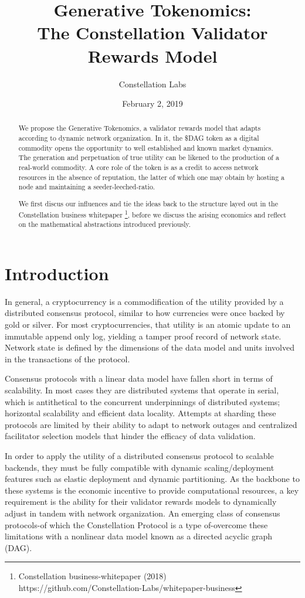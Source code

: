\documentclass{article}
\title{Generative Tokenomics:\\ The Constellation Validator Rewards Model}
\author{Constellation Labs}
\date{February 2, 2019}
\begin{document}
\maketitle

\begin{abstract}
We propose the Generative Tokenomics, a validator rewards model that adapts according to dynamic network organization. In it, the \$DAG token as a digital commodity opens the opportunity to well established and known market dynamics. The generation and perpetuation of true utility can be likened to the production of a real-world commodity. A core role of the token is as a credit to access network resources in the absence of reputation, the latter of which one may obtain by hosting a node and maintaining a seeder-leeched-ratio.

We first discus our influences and tie the ideas back to the structure layed out in the Constellation business whitepaper
\footnote{Constellation business-whitepaper (2018)\\ https://github.com/Constellation-Labs/whitepaper-business}, 
before we discuss the arising economics and reflect on the mathematical abstractions introduced previously. 
\end{abstract}

\setcounter{secnumdepth}{0}
\section{Introduction}
In general, a cryptocurrency is a commodification of the utility provided by a distributed consensus protocol, similar to how currencies were once backed by gold or silver. For most cryptocurrencies, that utility is an atomic update to an immutable append only log, yielding a tamper proof record of network state. Network state is defined by the dimensions of the data model and units involved in the transactions of the protocol. 

Consensus protocols with a linear data model have fallen short in terms of scalability. In most cases they are distributed systems that operate in serial, which is antithetical to the concurrent underpinnings of distributed systems; horizontal scalability and efficient data locality. Attempts at sharding these protocols are limited by their ability to adapt to network outages and centralized facilitator selection models that hinder the efficacy of data validation. 

In order to apply the utility of a distributed consensus protocol to scalable backends, they must be fully compatible with dynamic scaling/deployment features such as elastic deployment and dynamic partitioning. As the backbone to these systems is the economic incentive to provide computational resources, a key requirement is the ability for their validator rewards models to dynamically adjust in tandem with network organization. An emerging class of consensus protocols-of which the Constellation Protocol is a type of-overcome these limitations with a nonlinear data model known as a directed acyclic graph (DAG).
\end{document}
